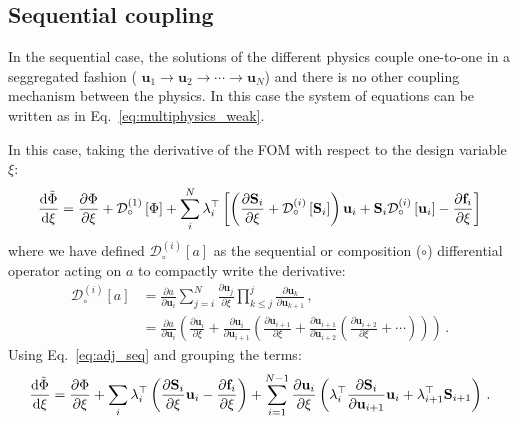 \subsection{Sequential coupling}

In the sequential case, the solutions of the different physics couple one-to-one in a seggregated fashion (
$\mathbf{u}_1 \to \mathbf{u}_2 \to \cdots \to \mathbf{u}_N$)
and there is no other coupling mechanism between the physics. In this case the system of equations can be written as in Eq.~\eqref{eq:multiphysics_weak}.



In this case, taking the derivative of the FOM with respect to the design variable $\xi$:
\begin{equation}\label{eq:adj_seq}
    \frac{\mathop{}\!\text{d} \tilde{\Phi}}{\mathop{}\!\text{d} \xi} = \frac{\partial \Phi}{\partial \xi} + \mathcal{D}^{(1)}_\circ \left[\Phi\right] + 
    \sum^N_i \lambda_{i}^{\top} \left[ \left(\frac{\partial \mathbf{S}_i}{\partial \xi} +  \mathcal{D}^{(i)}_\circ \left[\mathbf{S}_i\right]\right) \mathbf{u}_i
    + \mathbf{S}_i \mathcal{D}^{(i)}_\circ \left[\mathbf{u}_i\right] - \frac{\partial \mathbf{f}_i}{\partial \xi }\right]
\end{equation}
where we have defined $\mathcal{D}^{(i)}_\circ[a]$ as the sequential or composition ($\circ$) differential operator acting on $a$ to compactly write the derivative:
\begin{align}
    \mathcal{D}^{(i)}_\circ[a] &= \frac{\partial a}{\partial \mathbf{u}_i} \sum_{j=i}^{N} \frac{\partial \mathbf{u}_j}{\partial \xi} 
        \prod_{k \leq j}^{j} \frac{\partial \mathbf{u}_k}{\partial \mathbf{u}_{k+1}}\,, \\
        &= \frac{\partial a}{\partial \mathbf{u}_i} \left( \frac{\partial \mathbf{u}_i}{\partial \xi} + 
            \frac{\partial \mathbf{u}_i}{\partial \mathbf{u}_{i+1}} \left( \frac{\partial \mathbf{u}_{i+1}}{\partial \xi} + 
                \frac{\partial \mathbf{u}_{i+1}}{\partial \mathbf{u}_{i+2}} \left( \frac{\partial \mathbf{u}_{i+2}}{\partial \xi} + 
                    \cdots
                \right)
            \right)
        \right) \,.
    \end{align}
Using Eq.~\eqref{eq:adj_seq} and grouping the terms:
\begin{equation}
    \frac{\mathop{}\!\text{d} \tilde{\Phi}}{\mathop{}\!\text{d} \xi} =  \frac{\partial \Phi}{\partial \xi} + \sum_i \lambda_{i}^{\top} \left( \frac{\partial \mathbf{S}_i}{\partial \xi} \mathbf{u}_i - \frac{\partial \mathbf{f}_i}{\partial \xi} \right)
    + \sum^{N-1}_{i=1}  \frac{\partial \mathbf{u}_{i}}{\partial \xi} \left( \lambda_{i}^{\top} \frac{\partial \mathbf{S}_i}{\partial \mathbf{u}_{i+1}}\mathbf{u}_{i}
    +  \lambda_{i+1}^{\top} \mathbf{S}_{i+1}\right)\,.
\end{equation}
